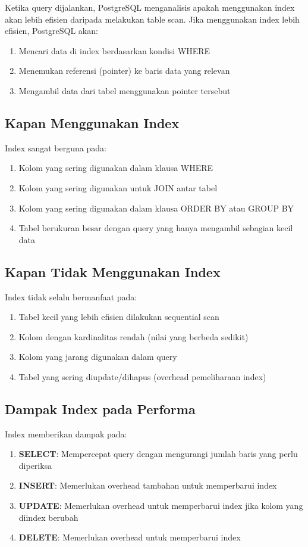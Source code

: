 Ketika query dijalankan, PostgreSQL menganalisis apakah menggunakan index akan lebih efisien daripada melakukan table scan. Jika menggunakan index lebih efisien, PostgreSQL akan:
\begin{enumerate}
    \item Mencari data di index berdasarkan kondisi WHERE
    \item Menemukan referensi (pointer) ke baris data yang relevan
    \item Mengambil data dari tabel menggunakan pointer tersebut
\end{enumerate}

\subsection{Kapan Menggunakan Index}
Index sangat berguna pada:
\begin{enumerate}
    \item Kolom yang sering digunakan dalam klausa WHERE
    \item Kolom yang sering digunakan untuk JOIN antar tabel
    \item Kolom yang sering digunakan dalam klausa ORDER BY atau GROUP BY
    \item Tabel berukuran besar dengan query yang hanya mengambil sebagian kecil data
\end{enumerate}

\subsection{Kapan Tidak Menggunakan Index}
Index tidak selalu bermanfaat pada:
\begin{enumerate}
    \item Tabel kecil yang lebih efisien dilakukan sequential scan
    \item Kolom dengan kardinalitas rendah (nilai yang berbeda sedikit)
    \item Kolom yang jarang digunakan dalam query
    \item Tabel yang sering diupdate/dihapus (overhead pemeliharaan index)
\end{enumerate}

\subsection{Dampak Index pada Performa}
Index memberikan dampak pada:
\begin{enumerate}
    \item \textbf{SELECT}: Mempercepat query dengan mengurangi jumlah baris yang perlu diperiksa
    \item \textbf{INSERT}: Memerlukan overhead tambahan untuk memperbarui index
    \item \textbf{UPDATE}: Memerlukan overhead untuk memperbarui index jika kolom yang diindex berubah
    \item \textbf{DELETE}: Memerlukan overhead untuk memperbarui index
\end{enumerate}

